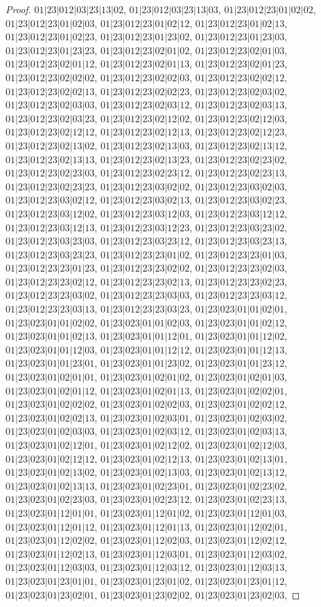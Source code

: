 \documentclass[12pt]{article}
\theoremstyle{plain}
\theoremstyle{definition}
\theoremstyle{remark}
\begin{document}
\begin{proof}
$01|23|012|03|23|13|02$, $01|23|012|03|23|13|03$, $01|23|012|23|01|02|02$, $01|23|012|23|01|02|03$, $01|23|012|23|01|02|12$, $01|23|012|23|01|02|13$, $01|23|012|23|01|02|23$, $01|23|012|23|01|23|02$, $01|23|012|23|01|23|03$, $01|23|012|23|01|23|23$, $01|23|012|23|02|01|02$, $01|23|012|23|02|01|03$, $01|23|012|23|02|01|12$, $01|23|012|23|02|01|13$, $01|23|012|23|02|01|23$, $01|23|012|23|02|02|02$, $01|23|012|23|02|02|03$, $01|23|012|23|02|02|12$, $01|23|012|23|02|02|13$, $01|23|012|23|02|02|23$, $01|23|012|23|02|03|02$, $01|23|012|23|02|03|03$, $01|23|012|23|02|03|12$, $01|23|012|23|02|03|13$, $01|23|012|23|02|03|23$, $01|23|012|23|02|12|02$, $01|23|012|23|02|12|03$, $01|23|012|23|02|12|12$, $01|23|012|23|02|12|13$, $01|23|012|23|02|12|23$, $01|23|012|23|02|13|02$, $01|23|012|23|02|13|03$, $01|23|012|23|02|13|12$, $01|23|012|23|02|13|13$, $01|23|012|23|02|13|23$, $01|23|012|23|02|23|02$, $01|23|012|23|02|23|03$, $01|23|012|23|02|23|12$, $01|23|012|23|02|23|13$, $01|23|012|23|02|23|23$, $01|23|012|23|03|02|02$, $01|23|012|23|03|02|03$, $01|23|012|23|03|02|12$, $01|23|012|23|03|02|13$, $01|23|012|23|03|02|23$, $01|23|012|23|03|12|02$, $01|23|012|23|03|12|03$, $01|23|012|23|03|12|12$, $01|23|012|23|03|12|13$, $01|23|012|23|03|12|23$, $01|23|012|23|03|23|02$, $01|23|012|23|03|23|03$, $01|23|012|23|03|23|12$, $01|23|012|23|03|23|13$, $01|23|012|23|03|23|23$, $01|23|012|23|23|01|02$, $01|23|012|23|23|01|03$, $01|23|012|23|23|01|23$, $01|23|012|23|23|02|02$, $01|23|012|23|23|02|03$, $01|23|012|23|23|02|12$, $01|23|012|23|23|02|13$, $01|23|012|23|23|02|23$, $01|23|012|23|23|03|02$, $01|23|012|23|23|03|03$, $01|23|012|23|23|03|12$, $01|23|012|23|23|03|13$, $01|23|012|23|23|03|23$, $01|23|023|01|01|02|01$, $01|23|023|01|01|02|02$, $01|23|023|01|01|02|03$, $01|23|023|01|01|02|12$, $01|23|023|01|01|02|13$, $01|23|023|01|01|12|01$, $01|23|023|01|01|12|02$, $01|23|023|01|01|12|03$, $01|23|023|01|01|12|12$, $01|23|023|01|01|12|13$, $01|23|023|01|01|23|01$, $01|23|023|01|01|23|02$, $01|23|023|01|01|23|12$, $01|23|023|01|02|01|01$, $01|23|023|01|02|01|02$, $01|23|023|01|02|01|03$, $01|23|023|01|02|01|12$, $01|23|023|01|02|01|13$, $01|23|023|01|02|02|01$, $01|23|023|01|02|02|02$, $01|23|023|01|02|02|03$, $01|23|023|01|02|02|12$, $01|23|023|01|02|02|13$, $01|23|023|01|02|03|01$, $01|23|023|01|02|03|02$, $01|23|023|01|02|03|03$, $01|23|023|01|02|03|12$, $01|23|023|01|02|03|13$, $01|23|023|01|02|12|01$, $01|23|023|01|02|12|02$, $01|23|023|01|02|12|03$, $01|23|023|01|02|12|12$, $01|23|023|01|02|12|13$, $01|23|023|01|02|13|01$, $01|23|023|01|02|13|02$, $01|23|023|01|02|13|03$, $01|23|023|01|02|13|12$, $01|23|023|01|02|13|13$, $01|23|023|01|02|23|01$, $01|23|023|01|02|23|02$, $01|23|023|01|02|23|03$, $01|23|023|01|02|23|12$, $01|23|023|01|02|23|13$, $01|23|023|01|12|01|01$, $01|23|023|01|12|01|02$, $01|23|023|01|12|01|03$, $01|23|023|01|12|01|12$, $01|23|023|01|12|01|13$, $01|23|023|01|12|02|01$, $01|23|023|01|12|02|02$, $01|23|023|01|12|02|03$, $01|23|023|01|12|02|12$, $01|23|023|01|12|02|13$, $01|23|023|01|12|03|01$, $01|23|023|01|12|03|02$, $01|23|023|01|12|03|03$, $01|23|023|01|12|03|12$, $01|23|023|01|12|03|13$, $01|23|023|01|23|01|01$, $01|23|023|01|23|01|02$, $01|23|023|01|23|01|12$, $01|23|023|01|23|02|01$, $01|23|023|01|23|02|02$, $01|23|023|01|23|02|03$, 
\end{proof}
\end{document}
